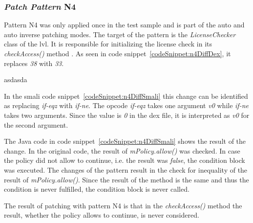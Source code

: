 \subsubsection{\textit{Patch Pattern} N4}
Pattern N4 was only applied once in the test sample and is part of the auto and auto inverse patching modes.
The target of the pattern is the \textit{LicenseChecker} class of the \gls{lvl}.
It is responsible for initializing the license check in its \textit{checkAccess()} method \cite{developersLicensingReference}.
\newline
As seen in code snippet~\ref{codeSnippet:n4DiffDex}, it replaces \textit{38} with \textit{33}.
\newline

asdasda
\newline

In the smali code snippet~\ref{codeSnippet:n4DiffSmali} this change can be identified as replacing \textit{if-eqz} with \textit{if-ne}.
The opcode \textit{if-eqz} takes one argument \textit{v0} while \textit{if-ne} takes two arguments.
Since the value is \textit{0} in the \gls{dex} file, it is interpreted as \textit{v0} for the second argument.
\newline

The Java code in code snippet~\ref{codeSnippet:n4DiffSmali} shows the result of the change.
In the original code, the result of \textit{mPolicy.allow()} was checked.
In case the policy did not allow to continue, i.e. the result was \textit{false}, the condition block was executed.
The changes of the pattern result in the check for inequality of the result of \textit{mPolicy.allow()}.
Since the result of the method is the same and thus the condition is never fulfilled, the condition block is never called.
\newline

The result of patching with pattern N4 is that in the \textit{checkAccess()} method the result, whether the policy allows to continue, is never considered.

